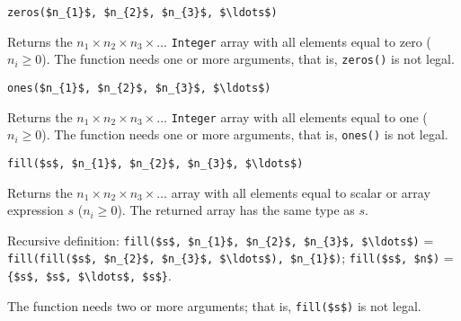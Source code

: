 \begin{operatordefinition}[zeros]
\begin{synopsis}\begin{lstlisting}
zeros($n_{1}$, $n_{2}$, $n_{3}$, $\ldots$)
\end{lstlisting}\end{synopsis}
\begin{semantics}
Returns the $n_{1} \times n_{2} \times n_{3} \times \ldots$ \lstinline!Integer! array with all elements equal to zero ($n_{i} \geq 0$).
The function needs one or more arguments, that is, \lstinline!zeros()! is not legal.
\end{semantics}
\end{operatordefinition}

\begin{operatordefinition}[ones]
\begin{synopsis}\begin{lstlisting}
ones($n_{1}$, $n_{2}$, $n_{3}$, $\ldots$)
\end{lstlisting}\end{synopsis}
\begin{semantics}
Returns the $n_{1} \times n_{2} \times n_{3} \times \ldots$ \lstinline!Integer! array with all elements equal to one ($n_{i} \geq 0$).
The function needs one or more arguments, that is, \lstinline!ones()! is not legal.
\end{semantics}
\end{operatordefinition}

\begin{operatordefinition}[fill]
\begin{synopsis}\begin{lstlisting}
fill($s$, $n_{1}$, $n_{2}$, $n_{3}$, $\ldots$)
\end{lstlisting}\end{synopsis}
\begin{semantics}
Returns the $n_{1} \times n_{2} \times n_{3} \times \ldots$ array with all elements equal to scalar or array expression $s$ ($n_{i} \geq 0$).
The returned array has the same type as $s$.

Recursive definition:
\lstinline!fill($s$, $n_{1}$, $n_{2}$, $n_{3}$, $\ldots$)! =
\lstinline!fill(fill($s$, $n_{2}$, $n_{3}$, $\ldots$), $n_{1}$)!;
\lstinline!fill($s$, $n$)! = \lstinline!{$s$, $s$, $\ldots$, $s$}!.

The function needs two or more arguments; that is, \lstinline!fill($s$)! is not legal.
\end{semantics}
\end{operatordefinition}

